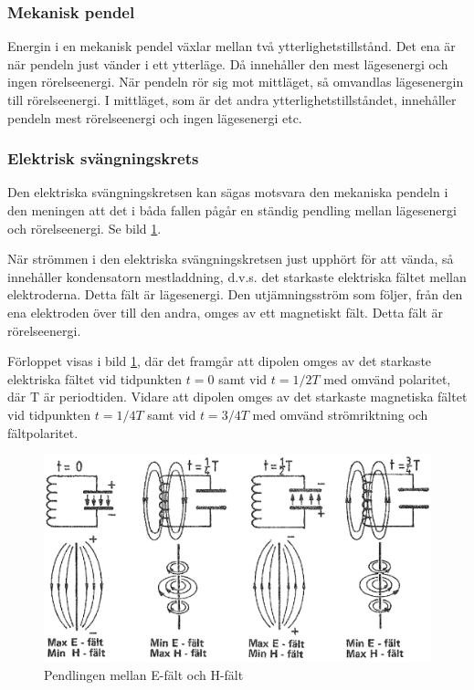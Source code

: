 \subsubsection{Mekanisk pendel}

Energin i en mekanisk pendel växlar mellan två
ytterlighetstillstånd. Det ena är när pendeln just vänder i ett
ytterläge. Då innehåller den mest lägesenergi och ingen
rörelseenergi. När pendeln rör sig mot mittläget, så omvandlas
lägesenergin till rörelseenergi. I mittläget, som är det andra
ytterlighetstillståndet, innehåller pendeln mest rörelseenergi och
ingen lägesenergi etc.

\subsubsection{Elektrisk svängningskrets}

Den elektriska svängningskretsen kan sägas motsvara den mekaniska
pendeln i den meningen att det i båda fallen pågår en ständig pendling
mellan lägesenergi och rörelseenergi. Se bild \ref{fig:BildII7-02}.

När strömmen i den elektriska svängningskretsen just upphört för att
vända, så innehåller kondensatorn mestladdning, d.v.s. det starkaste
elektriska fältet mellan elektroderna. Detta fält är lägesenergi. Den
utjämningsström som följer, från den ena elektroden över till den
andra, omges av ett magnetiskt fält. Detta fält är rörelseenergi.

Förloppet visas i bild \ref{fig:BildII7-02}, där det framgår att dipolen omges av
det starkaste elektriska fältet vid tidpunkten \(t=0\) samt vid
\(t=1/2T\) med omvänd polaritet, där T är periodtiden. Vidare att
dipolen omges av det starkaste magnetiska fältet vid tidpunkten
\(t=1/4T\) samt vid \(t=3/4T\) med omvänd strömriktning och
fältpolaritet.

\begin{figure}
\includegraphics[width=\textwidth]{images/cropped_pdfs/bild_2_7-02.pdf}
\caption{Pendlingen mellan E-fält och H-fält}
\label{fig:BildII7-02}
\end{figure}

